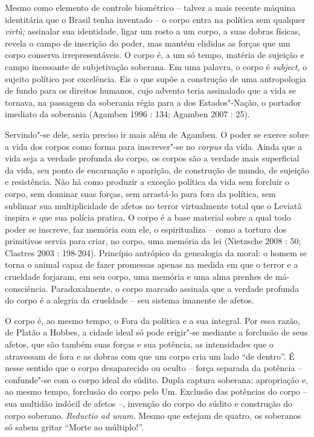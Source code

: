 Mesmo como elemento de controle biométrico -- talvez a mais recente
máquina identitária que o Brasil tenha inventado -- o corpo entra na
política sem qualquer \emph{virtù; }assinalar sua identidade, ligar um
rosto a um corpo, a suas dobras físicas, revela o campo de inscrição do
poder, mas mantém elididas as forças que um corpo conserva
irrepresentáveis. O corpo é, a um só tempo, matéria de sujeição e campo
incessante de subjetivação soberana. Em uma palavra, o corpo é
\emph{subject,} o sujeito político por excelência. Eis o que supõe a
construção de uma antropologia de fundo para os direitos humanos, cujo
advento teria assinalado que a vida se tornava, na passagem da soberania
régia para a dos Estados"-Nação, o portador imediato da soberania
(Agamben 1996 : 134; Agamben 2007 : 25).

Servindo"-se dele, seria preciso ir mais além de Agamben. O poder se
exerce sobre a vida dos corpos como forma para inscrever"-se no
\emph{corpus }da vida. Ainda que a vida seja a verdade profunda do
corpo, os corpos são a verdade mais superficial da vida, seu ponto de
encarnação e aparição, de construção de mundo, de sujeição e
resistência. Não há como produzir a exceção política da vida sem
forcluir o corpo, sem dominar suas forças, sem arrastá-lo para fora da
política, sem sublimar sua multiplicidade de afetos no terror
virtualmente total que o Leviatã inspira e que sua polícia pratica. O
corpo é a base material sobre a qual todo poder se inscreve, faz memória
com ele, o espiritualiza -- como a tortura dos primitivos servia para
criar, no corpo, uma memória da lei (Nietzsche 2008 : 50; Clastres 2003
: 198-204). Princípio antrópico da genealogia da moral: o homem se torna
o animal capaz de fazer promessas apenas na medida em que o terror e a
crueldade forjaram, em seu corpo, uma memória e uma alma prenhes de
má-consciência. Paradoxalmente, o corpo marcado assinala que a verdade
profunda do corpo é a alegria da crueldade -- seu sistema imanente de
afetos.

O corpo é, ao mesmo tempo, o Fora da política e a sua integral. Por essa
razão, de Platão a Hobbes, a cidade ideal só pode erigir"-se mediante a
forclusão de seus afetos, que são também suas forças e sua potência, as
intensidades que o atravessam de fora e as dobras com que um corpo cria
um lado ``de dentro''. É nesse sentido que o corpo desaparecido ou
oculto -- força separada da potência -- confunde"-se com o corpo ideal do
súdito. Dupla captura soberana: apropriação e, ao mesmo tempo, forclusão
do corpo pelo Um. Exclusão das potências do corpo -- sua multidão
indócil de afetos --, invenção do corpo do súdito e construção do corpo
soberano. \emph{Reductio ad unum. }Mesmo que estejam de quatro, os
soberanos só sabem gritar ``Morte ao múltiplo!''.

